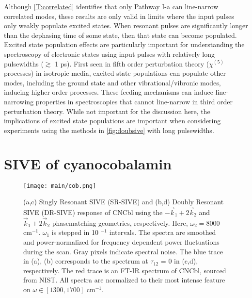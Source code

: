 \documentclass[aip, jcp, reprint, onecolumn]{revtex4-2}
\begin{document}
Although \autoref{T:correlated} identifies that only Pathway I-a can line-narrow correlated modes, these results are only valid in limits where the input pulses only weakly populate excited states.
When resonant pulses are significantly longer than the dephasing time of some state, then that state can become populated.
Excited state population effects are particularly important for understanding the spectroscopy of electronic states using input pulses with relatively long pulsewidths ($\gtrsim$ 1 ps). \cite{RN319}
First seen in fifth order perturbation theory ($\chi^{(5)}$ processes) in isotropic media, excited state populations can populate other modes, including the ground state and other vibrational/vibronic modes, inducing higher order processes.\cite{Carlson87, RN471}
These feeding mechanisms can induce line-narrowing properties in spectroscopies that cannot line-narrow in third order perturbation theory.\cite{RN319, Carlson87, RN471, RN410}
While not important for the discussion here, the implications of excited state populations are important when considering experiments using the methods in \autoref{fig:doubsive} with long pulsewidths. 

\section{SIVE of cyanocobalamin}

\begin{figure*}[!htbp]
	\centering
	\texttt{[image: main/cob.png]}
	\caption{
		(a,c) Singly Resonant SIVE (SR-SIVE) and (b,d) Doubly Resonant SIVE (DR-SIVE) response of CNCbl using the $-\vec{k}_1 + 2\vec{k}_2$ and $\vec{k}_1 + 2\vec{k}_2$ phasematching geometries, respectively.
		Here, $\omega_2 = 8000$ cm$^{-1}$.
		$\omega_1$ is stepped in 10 $^{-1}$ intervals.
		The spectra are smoothed and power-normalized for frequency dependent power fluctuations during the scan.
		Gray pixels indicate spectral noise.
		The blue trace in (a), (b) corresponds to the spectrum at $\tau_{12}$ = 0 in (c,d), respectively.
		The red trace is an FT-IR spectrum of CNCbl, sourced from NIST. 
		All spectra are normalized to their most intense feature on $\omega \in [1300, 1700]$ cm$^{-1}$.}
	\label{fig:cobsive}
\end{figure*}
\end{document}
